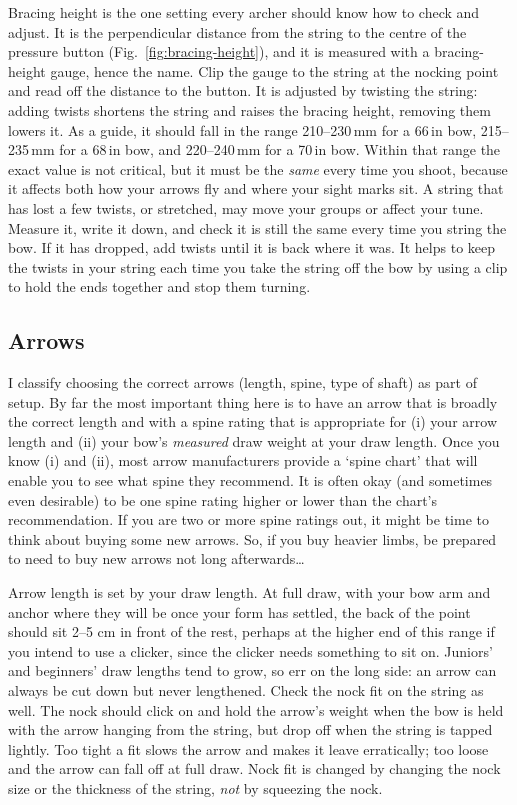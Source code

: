 \documentclass[11pt]{article}
\let\plainsubsection\subsection
\renewcommand{\subsection}{\FloatBarrier\plainsubsection}
\begin{document}
Bracing height is the one setting every archer should know how to check and adjust. It is the perpendicular distance from the string to the centre of the pressure button (Fig.~\ref{fig:bracing-height}), and it is measured with a bracing-height gauge, hence the name. Clip the gauge to the string at the nocking point and read off the distance to the button. It is adjusted by twisting the string: adding twists shortens the string and raises the bracing height, removing them lowers it. As a guide, it should fall in the range 210--230\,mm for a 66\,in bow, 215--235\,mm for a 68\,in bow, and 220--240\,mm for a 70\,in bow. Within that range the exact value is not critical, but it must be the \emph{same} every time you shoot, because it affects both how your arrows fly and where your sight marks sit. A string that has lost a few twists, or stretched, may move your groups or affect your tune. Measure it, write it down, and check it is still the same every time you string the bow. If it has dropped, add twists until it is back where it was. It helps to keep the twists in your string each time you take the string off the bow by using a clip to hold the ends together and stop them turning.

\subsection{Arrows}

I classify choosing the correct arrows (length, spine, type of shaft) as part of setup. By far the most important thing here is to have an arrow that is broadly the correct length and with a spine rating that is appropriate for (i) your arrow length and (ii) your bow's \textit{measured} draw weight at your draw length. Once you know (i) and (ii), most arrow manufacturers provide a `spine chart' that will enable you to see what spine they recommend. It is often okay (and sometimes even desirable) to be one spine rating higher or lower than the chart's recommendation. If you are two or more spine ratings out, it might be time to think about buying some new arrows. So, if you buy heavier limbs, be prepared to need to buy new arrows not long afterwards\ldots

Arrow length is set by your draw length. At full draw, with your bow arm and anchor where they will be once your form has settled, the back of the point should sit 2--5 cm in front of the rest, perhaps at the higher end of this range if you intend to use a clicker, since the clicker needs something to sit on. Juniors' and beginners' draw lengths tend to grow, so err on the long side: an arrow can always be cut down but never lengthened. Check the nock fit on the string as well. The nock should click on and hold the arrow's weight when the bow is held with the arrow hanging from the string, but drop off when the string is tapped lightly. Too tight a fit slows the arrow and makes it leave erratically; too loose and the arrow can fall off at full draw. Nock fit is changed by changing the nock size or the thickness of the string, \emph{not} by squeezing the nock.
\end{document}
